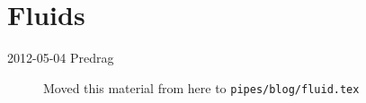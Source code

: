 
\chapter{Fluids}
\label{chap:fluids}


\begin{description}

\item[2012-05-04 Predrag] Moved this material from here to
\texttt{pipes/blog/fluid.tex}

\end{description}
